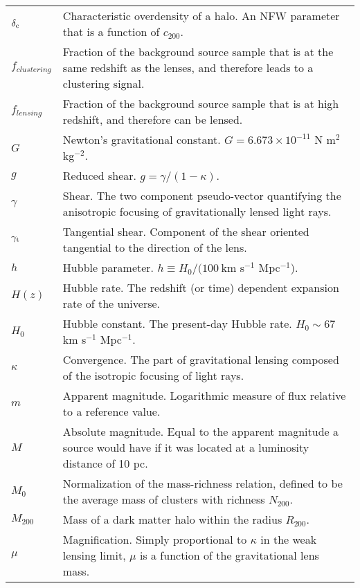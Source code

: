 \section*{\underline{}}
\vspace{-0.5cm}
\begin{tabular}{p{0.6in}p{5.8in}}

$\delta_{\rm c}$ & Characteristic overdensity of a halo. An \acs{NFW} parameter that is a function of $c_{200}$. \\
$f_{clustering}$ & Fraction of the background source sample that is at the same redshift as the lenses, and therefore leads to a clustering signal. \\
$f_{lensing}$ & Fraction of the background source sample that is at high redshift, and therefore can be lensed. \\
$G$ & Newton's gravitational constant. $G = 6.673 \times 10^{-11}$ N m$^2$ kg$^{-2}$.\\
$g$ & Reduced shear. $g = \gamma/(1-\kappa)$. \\
$\gamma$ & Shear. The two component pseudo-vector quantifying the anisotropic focusing of gravitationally lensed light rays. \\
$\gamma_{\rm t}$ & Tangential shear. Component of the shear oriented tangential to the direction of the lens. \\
$h$ & Hubble parameter. $h \equiv H_0/(100\ $km s$^{-1}$ Mpc$^{-1}$). \\
$H(z)$ & Hubble rate. The redshift (or time) dependent expansion rate of the universe. \\
$H_0$ & Hubble constant. The present-day Hubble rate. $H_0 \sim 67$ km s$^{-1}$ Mpc$^{-1}$. \\
$\kappa$ & Convergence. The part of gravitational lensing composed of the isotropic focusing of light rays. \\
$m$ & Apparent magnitude. Logarithmic measure of flux relative to a reference value. \\
$M$ & Absolute magnitude. Equal to the apparent magnitude a source would have if it was located at a luminosity distance of 10 pc. \\
$M_0$ & Normalization of the mass-richness relation, defined to be the average mass of clusters with richness $N_{200}$. \\
$M_{200}$ & Mass of a dark matter halo within the radius $R_{200}$. \\
$\mu$ & Magnification. Simply proportional to $\kappa$ in the weak lensing limit, $\mu$ is a function of the gravitational lens mass. \\

\end{tabular}
